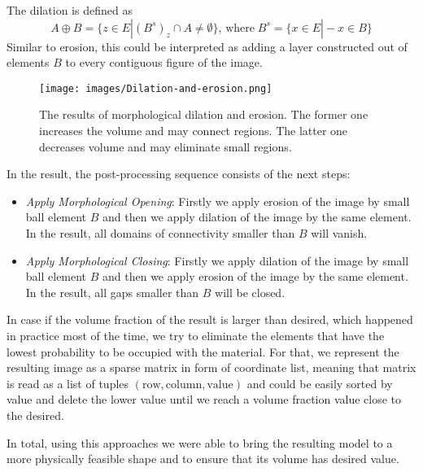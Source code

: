 The dilation is defined as 
\begin{equation}
A \oplus B = \{z \in E | (B^{s})_{z} \cap  A \neq \emptyset \}, \, \mathrm{where} \; B^{s}=\{x \in E | -x \in B \}
\end{equation} 
Similar to erosion, this could be interpreted as adding a layer constructed out of elements $B$ to every contiguous figure of the image. 
\medskip
\begin{figure}
	\centering
	\texttt{[image: images/Dilation-and-erosion.png]}
	\label{fig:dil-eros}
	\caption{The results of morphological dilation and erosion. The former one increases the volume and may connect regions. The latter one decreases volume and may eliminate small regions.}
\end{figure}
\medskip

In the result, the post-processing sequence consists of the next steps:
\begin{itemize}
	\item \emph{Apply Morphological Opening}: Firstly we apply erosion of the image by small ball element $B$ and then we apply dilation of the image by the same element. In the result, all domains of connectivity smaller than $B$ will vanish.
	\item \emph{Apply Morphological Closing}: Firstly we apply dilation of the image by small ball element $B$ and then we apply erosion of the image by the same element. In the result, all gaps smaller than $B$ will be closed.
\end{itemize}
\medskip

In case if the volume fraction of the result is larger than desired, which happened in practice most of the time, we try to eliminate the elements that have the lowest probability to be occupied with the material.
For that, we represent the resulting image as a sparse matrix in form of coordinate list, meaning that matrix is read as a list of tuples $(\mathrm{row},\mathrm{column},\mathrm{value})$ and could be easily sorted by value and delete the lower value until we reach a volume fraction value close to the desired.
\medskip

In total, using this approaches we were able to bring the resulting model to a more physically feasible shape and to ensure that its volume has desired value.
\medskip
{}

 